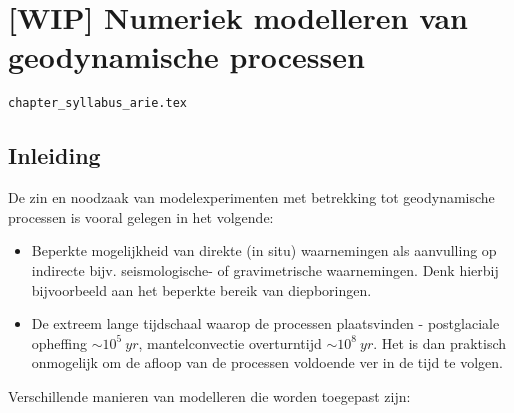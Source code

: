 \chapter{[WIP] Numeriek modelleren van geodynamische processen} %

\begin{flushright} {\tiny {\color{gray} \tt chapter\_syllabus\_arie.tex}} \end{flushright}

\section{Inleiding}

De zin en noodzaak van modelexperimenten 
met betrekking tot geodynamische processen is vooral gelegen in het 
volgende:
\begin{itemize}
\item Beperkte mogelijkheid van direkte (in situ) waarnemingen 
als aanvulling op indirecte bijv. seismologische- of gravimetrische
waarnemingen.
Denk hierbij bijvoorbeeld aan het beperkte bereik van diepboringen.
\item De extreem lange tijdschaal waarop de processen plaatsvinden
 - postglaciale opheffing $\sim 10^5 \ yr$, mantelconvectie overturntijd
 $\sim 10^8 \ yr$.
Het is dan praktisch onmogelijk om de afloop van de processen 
voldoende ver in de tijd te volgen.
\end{itemize}

\noindent
Verschillende manieren van modelleren die worden toegepast zijn:

